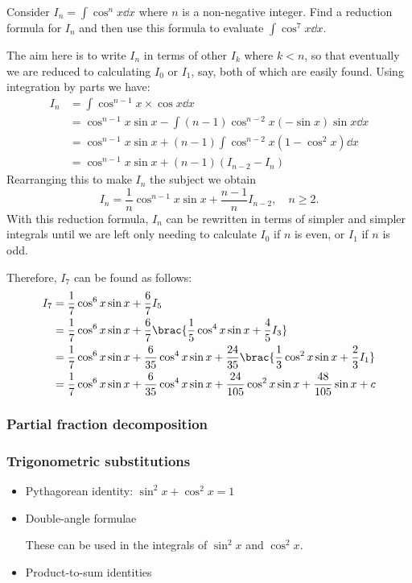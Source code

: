 \begin{exercise}{}{}
Consider $I_n=\int\cos^nx\dd{x}$ where $n$ is a non-negative integer. Find a reduction formula for $I_n$ and then use this formula to evaluate $\int\cos^7x\dd{x}$.
\end{exercise}
\begin{solution}
The aim here is to write $I_n$ in terms of other $I_k$ where $k<n$, so that eventually we are reduced to calculating $I_0$ or $I_1$, say, both of which are easily found. Using integration by parts we have:
\begin{align*}
I_n &= \int\cos^{n-1}x \times \cos x\dd{x} \\
&= \cos^{n-1}x\sin x-\int(n-1)\cos^{n-2}x(-\sin x)\sin x\dd{x} \\
&= \cos^{n-1}x\sin x+(n-1)\int\cos^{n-2}x(1-\cos^2x)\dd{x} \\
&= \cos^{n-1}x\sin x+(n-1)(I_{n-2}-I_n)
\end{align*}
Rearranging this to make $I_n$ the subject we obtain
\[ I_n=\frac{1}{n}\cos^{n-1}x\sin x+\frac{n-1}{n}I_{n-2}, \quad n\ge2. \]
With this reduction formula, $I_n$ can be rewritten in terms of simpler and simpler integrals until we are left only needing to calculate $I_0$ if $n$ is even, or $I_1$ if $n$ is odd.

Therefore, $I_7$ can be found as follows:
\begin{align*}
I_7 &= \frac{1}{7}\cos^6x\sin x+\frac{6}{7}I_5 \\
&= \frac{1}{7}\cos^6x\sin x+\frac{6}{7}\brac{\frac{1}{5}\cos^4x\sin x+\frac{4}{5}I_3} \\
&= \frac{1}{7}\cos^6x\sin x+\frac{6}{35}\cos^4x\sin x+\frac{24}{35}\brac{\frac{1}{3}\cos^2x\sin x+\frac{2}{3}I_1} \\
&= \frac{1}{7}\cos^6x\sin x+\frac{6}{35}\cos^4x\sin x+\frac{24}{105}\cos^2x\sin x+\frac{48}{105}\sin x+c
\end{align*}
\end{solution}

\subsubsection{Partial fraction decomposition}

\subsubsection{Trigonometric substitutions}
\begin{itemize}
\item Pythagorean identity: $\sin^2x + \cos^2x = 1$

\item Double-angle formulae

These can be used in the integrals of $\sin^2x$ and $\cos^2x$.

\item Product-to-sum identities
\end{itemize}


